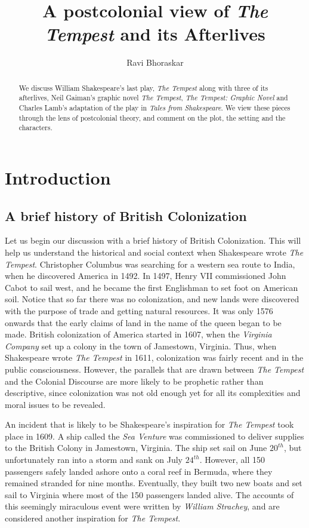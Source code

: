 \documentclass{article}
\title{A postcolonial view of \emph{The Tempest} and its Afterlives}
\author {Ravi Bhoraskar}
\begin{document}
\maketitle
\begin{abstract}
  We discuss William Shakespeare's last play, \emph{The Tempest} along with three of its afterlives, Neil Gaiman's graphic novel \emph{The Tempest}, \emph{The Tempest: Graphic Novel} and Charles Lamb's adaptation of the play in \emph{Tales from Shakespeare}. We view these pieces through the lens of postcolonial theory, and comment on the plot, the setting and the characters.
\end{abstract}
\section{Introduction}
\subsection{A brief history of British Colonization}
Let us begin our discussion with a brief history of British Colonization. This will help us understand the historical and social context when Shakespeare wrote \emph{The Tempest}. Christopher Columbus was searching for a western sea route to India, when he discovered America in 1492. In 1497, Henry VII commissioned John Cabot to sail west, and he became the first Englishman to set foot on American soil. Notice that so far there was no colonization, and new lands were discovered with the purpose of trade and getting natural resources. It was only 1576 onwards that the early claims of land in the name of the queen began to be made. British colonization of America started in 1607, when the \emph{Virginia Company} set up a colony in the town of Jamestown, Virginia. Thus, when Shakespeare wrote \emph{The Tempest} in 1611, colonization was fairly recent and in the public consciousness. However, the parallels that are drawn between \emph{The Tempest} and the Colonial Discourse are more likely to be prophetic rather than descriptive, since colonization was not old enough yet for all its complexities and moral issues to be revealed.

An incident that is likely to be Shakespeare's inspiration for \emph{The Tempest} took place in 1609. A ship called the \emph{Sea Venture} was commissioned to deliver supplies to the British Colony in Jamestown, Virginia. The ship set sail on June $20^{th}$, but unfortunately ran into a storm and sank on July $24^{th}$. However, all 150 passengers safely landed ashore onto a coral reef in Bermuda, where they remained stranded for nine months. Eventually, they built two new boats and set sail to Virginia where most of the 150 passengers landed alive. The accounts of this seemingly miraculous event were written by \emph{William Strachey}, and are considered another inspiration for \emph{The Tempest}.
\end{document}
